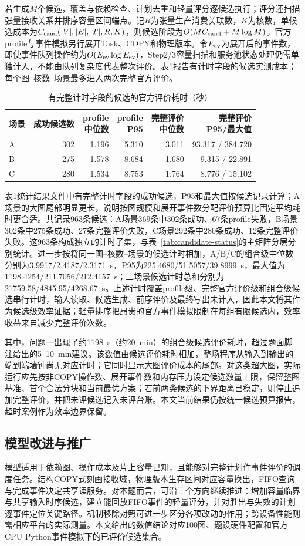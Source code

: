 若生成$M$个候选，覆盖与依赖检查、计划去重和轻量评分逐候选执行；评分还扫描张量接收关系并排序容量区间端点。记$R$为张量生产消费关联数，$K$为核数，单候选成本为$C_{\rm cand}(|V|,|E|,|T|,R,K)$，则候选阶段为$O(MC_{\rm cand}+M\log M)$。官方profile与事件模拟另行展开Task、COPY和物理版本。令$E_{\rm ev}$为展开后的事件数，即使事件队列操作约为$O(E_{\rm ev}\log E_{\rm ev})$，Step2/3容量扫描和服务池状态处理仍需单独计入，不能由队列复杂度代表整次评价。表\ref{tab:algorithm-timing}报告有计时字段的候选实测成本；每个图--核数--场景最多进入两次完整官方评价。
\begin{table}[H]\centering\small
\caption{有完整计时字段的候选的官方评价耗时（秒）}
\label{tab:algorithm-timing}
\setlength{\tabcolsep}{2.4pt}
\begin{tabular}{lrrrrr}\toprule
场景 & 成功候选数 & \shortstack{profile\\中位数} & \shortstack{profile\\P95} & \shortstack{完整评价\\中位数} & \shortstack{完整评价\\P95/最大值}\\\midrule
A & 302 & 1.196 & 5.310 & 3.011 & 93.317 / 384.720\\
B & 275 & 1.578 & 8.684 & 1.680 & 9.315 / 22.891\\
C & 280 & 1.534 & 8.753 & 1.764 & 8.776 / 15.102\\\bottomrule
\end{tabular}
\end{table}
表\ref{tab:algorithm-timing}统计结果文件中有完整计时字段的成功候选，P95和最大值按候选记录计算；A场景的大图尾部明显更长，说明按图规模和展开事件数分配评价预算比固定平均耗时更合适。共记录963条候选：A场景369条中302条成功、67条profile失败，B场景302条中275条成功、27条完整评价失败，C场景292条中280条成功、12条完整评价失败。这963条构成独立的计时子集，与表~\ref{tab:candidate-status}的主矩阵分层分别统计。进一步按将同一图--核数--场景的候选计时相加，A/B/C的组合级中位数分别为3.9917/2.4187/2.3171~s，P95为225.4680/51.5057/39.8999~s，最大值为1198.4254/211.7056/212.4157~s；三场景候选计时总和分别为21759.58/4845.95/4268.67~s。上述计时覆盖profile级、完整官方评价级和组合级候选串行计时，输入读取、候选生成、前序评价及最终写出未计入，因此本文将其作为候选级效率证据；轻量排序把昂贵的官方事件模拟限制在每组有限候选内，效率收益来自减少完整评价次数。

其中，问题一出现了约1198~s（约20~min）的组合级候选评价耗时，超过题面脚注给出的5--10~min建议。该数值由候选评价耗时相加，整场程序从输入到输出的端到端墙钟尚无对应计时；它同时显示大图评价成本的尾部。对这类超大图，实际运行应先按非COPY操作数、展开事件数和内存压力设定候选数量上限，保留整图基准、首个合法分块和当前最优方案；若前两类候选的下界距离已稳定，则停止追加完整评价，并把未评候选记入未评台账。本文当前结果仍按统一候选预算报告，超时案例作为效率边界保留。

\subsection{模型改进与推广}
模型适用于依赖图、操作成本及片上容量已知，且能够对完整计划作事件评价的调度任务。结构COPY式刻画接收域，物理版本生存区间对应容量换出，FIFO查询与完成事件决定共享读服务。对本题而言，可沿三个方向继续推进：增加容量临界与共享输入时序候选，建立能回放FIFO事件的轻量评分，并对胜出与失效的计划逐事件定位关键路径。机制移除对照可进一步区分各项改动的作用；跨设备性能则需相应平台的实际测量。本文给出的数值结论对应100图、题设硬件配置和官方CPU Python事件模拟下的已评价候选集合。
